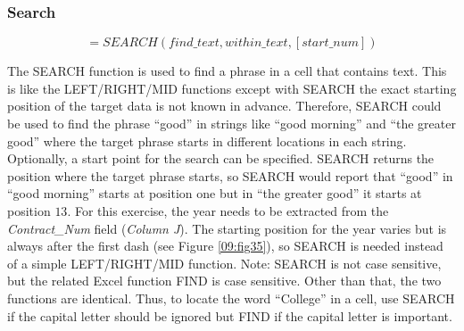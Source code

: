 \subsubsection{Search}	

\[ =SEARCH(find\_text, within\_text, [start\_num]) \]

The SEARCH function is used to find a phrase in a cell that contains text. This is like the LEFT/RIGHT/MID functions except with SEARCH the exact starting position of the target data is not known in advance. Therefore, SEARCH could be used to find the phrase ``good'' in strings like ``good morning'' and ``the greater good'' where the target phrase starts in different locations in each string. Optionally, a start point for the search can be specified. SEARCH returns the position where the target phrase starts, so SEARCH would report that ``good'' in ``good morning'' starts at position one but in ``the greater good'' it starts at position $ 13 $. For this exercise, the year needs to be extracted from the \textit{Contract\_Num} field (\textit{Column J}). The starting position for the year varies but is always after the first dash (see Figure \ref{09:fig35}), so SEARCH is needed instead of a simple LEFT/RIGHT/MID function. Note: SEARCH is not case sensitive, but the related Excel function FIND is case sensitive. Other than that, the two functions are identical. Thus, to locate the word ``College'' in a cell, use SEARCH if the capital letter should be ignored but FIND if the capital letter is important.

